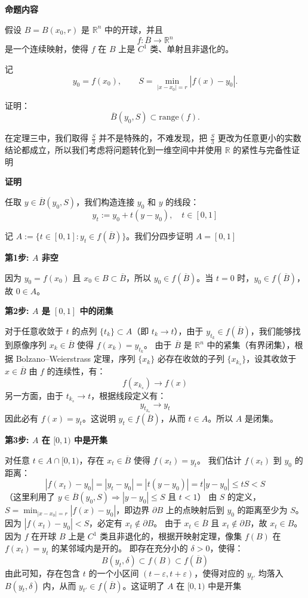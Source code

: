 \documentclass[12pt,a4paper]{ctexart}
\begin{document}
\textbf{命题内容}

假设 $B = B(x_0, r)$ 是 $\mathbb{R}^n$ 中的开球，并且
\[
f : \overline{B} \to \mathbb{R}^n
\]
是一个连续映射，使得 $f$ 在 $B$ 上是 $C^1$ 类、单射且非退化的。

记
\[
y_0 = f(x_0), \qquad S = \min_{|x - x_0|=r} |f(x) - y_0|.
\]

证明：
\[
\overline{B}(y_0, S) \subset \text{range}(f).
\]

在定理三中，我们取得 $\frac{S}{3}$ 并不是特殊的，不难发现，把 $\frac{S}{3}$ 更改为任意更小的实数结论都成立，所以我们考虑将问题转化到一维空间中并使用 $\mathbb{R}$ 的紧性与完备性证明

\textbf{证明}

任取 $y \in \overline{B}(y_0, S)$，我们构造连接 $y_0$ 和 $y$ 的线段：
\[
y_t := y_0 + t(y - y_0), \quad t \in [0, 1]
\]

记 $A := \{t \in [0, 1] : y_t \in f(\overline{B})\}$。我们分四步证明 $A = [0, 1]$

\textbf{第1步: $A$ 非空}

因为 $y_0 = f(x_0)$ 且 $x_0 \in B \subset \overline{B}$，所以 $y_0 \in f(\overline{B})$。当 $t=0$ 时，$y_0 \in f(\overline{B})$，故 $0 \in A$。

\textbf{第2步: $A$ 是 $[0, 1]$ 中的闭集}

对于任意收敛于 $t$ 的点列 $\{t_k\} \subset A$（即 $t_k \to t$），由于 $y_{t_k} \in f(\overline{B})$，我们能够找到原像序列 $x_k \in \overline{B}$ 使得 $f(x_k) = y_{t_k}$。
由于 $\overline{B}$ 是 $\mathbb{R}^n$ 中的紧集（有界闭集），根据 Bolzano–Weierstrass 定理，序列 $\{x_k\}$ 必存在收敛的子列 $\{x_{k_s}\}$，设其收敛于 $x \in \overline{B}$
由 $f$ 的连续性，有：
\[
f(x_{k_s}) \to f(x)
\]
另一方面，由于 $t_{k_s} \to t$，根据线段定义有：
\[
y_{t_{k_s}} \to y_t
\]
因此必有 $f(x) = y_t$。这说明 $y_t \in f(\overline{B})$，从而 $t \in A$。所以 $A$ 是闭集。

\textbf{第3步: $A$ 在 $[0, 1)$ 中是开集}

对任意 $t \in A \cap [0, 1)$，存在 $x_t \in \overline{B}$ 使得 $f(x_t) = y_t$。
我们估计 $f(x_t)$ 到 $y_0$ 的距离：
\[
|f(x_t) - y_0| = |y_t - y_0| = |t(y - y_0)| = t|y - y_0| \le tS < S
\]
（这里利用了 $y \in \overline{B}(y_0, S) \Rightarrow |y - y_0| \le S$ 且 $t < 1$）
由 $S$ 的定义，$S = \min_{|x - x_0|=r} |f(x) - y_0|$，即边界 $\partial B$ 上的点映射后到 $y_0$ 的距离至少为 $S$。因为 $|f(x_t) - y_0| < S$，必定有 $x_t \notin \partial B$。
由于 $x_t \in \overline{B}$ 且 $x_t \notin \partial B$，故 $x_t \in B$。
因为 $f$ 在开球 $B$ 上是 $C^1$ 类且非退化的，根据开映射定理，像集 $f(B)$ 在 $f(x_t) = y_t$ 的某邻域内是开的。
即存在充分小的 $\delta > 0$，使得：
\[
B(y_t, \delta) \subset f(B) \subset f(\overline{B})
\]
由此可知，存在包含 $t$ 的一个小区间 $(t - \varepsilon, t + \varepsilon)$，使得对应的 $y_{t'}$ 均落入 $B(y_t, \delta)$ 内，从而 $y_{t'} \in f(\overline{B})$。这证明了 $A$ 在 $[0, 1)$ 中是开集
\end{document}
